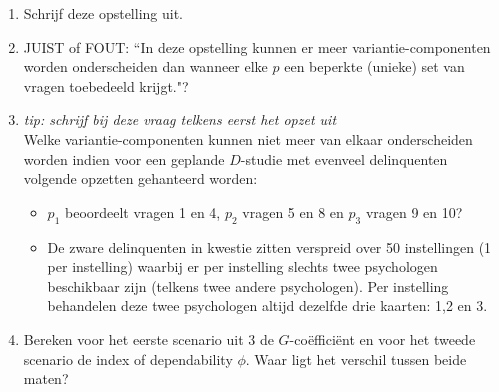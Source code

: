 {\begin{enumerate}
	\item Schrijf deze opstelling uit.
	\item JUIST of FOUT: ``In deze opstelling kunnen er meer variantie-componenten worden onderscheiden dan wanneer elke $p$ een beperkte (unieke) set van vragen toebedeeld krijgt."?
	\item \emph{tip: schrijf bij deze vraag telkens eerst het opzet uit}\\
	Welke variantie-componenten kunnen niet meer van elkaar onderscheiden worden indien voor een geplande $D$-studie met evenveel delinquenten volgende opzetten gehanteerd worden:
\begin{itemize}
	\item $p_1$ beoordeelt vragen 1 en 4, $p_2$ vragen 5 en 8 en $p_3$ vragen 9 en 10?
	\item De zware delinquenten in kwestie  zitten verspreid over 50 instellingen (1 per instelling) waarbij er per instelling slechts twee psychologen beschikbaar zijn (telkens twee andere psychologen). 
	Per instelling behandelen deze twee psychologen altijd dezelfde drie kaarten: 1,2 en 3. 
\end{itemize}
\item Bereken voor het eerste scenario uit 3 de $G$-co\"{e}ffici\"{e}nt en voor het tweede scenario de index of dependability $\phi$. Waar ligt het verschil tussen beide maten?
\end{enumerate}
}

